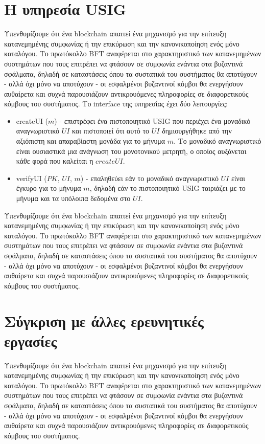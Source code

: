 \section{Η υπηρεσία USIG} \label{usigSection}
Υπενθυμίζουμε ότι ένα blockchain απαιτεί ένα μηχανισμό για την επίτευξη κατανεμημένης συμφωνίας ή την επικύρωση και την κανονικοποίηση ενός μόνο καταλόγου. Το πρωτόκολλο BFT αναφέρεται στο χαρακτηριστικό των κατανεμημένων συστημάτων που τους επιτρέπει να φτάσουν σε συμφωνία ενάντια στα βυζαντινά σφάλματα, δηλαδή σε καταστάσεις όπου τα συστατικά του συστήματος θα αποτύχουν - αλλά όχι μόνο να αποτύχουν - οι εσφαλμένοι βυζαντινοί κόμβοι θα ενεργήσουν αυθαίρετα και συχνά παρουσιάζουν αντικρουόμενες πληροφορίες σε διαφορετικούς κόμβους του συστήματος.
Το interface της υπηρεσίας έχει δύο λειτουργίες: 
\begin{itemize}
\item createUI ($m$) - επιστρέφει ένα πιστοποιητικό USIG που περιέχει ένα μοναδικό αναγνωριστικό $UI$ και πιστοποιεί ότι αυτό το $UI$ δημιουργήθηκε από την αξιόπιστη και απαραβίαστη μονάδα για το μήνυμα $m$. Το μοναδικό αναγνωριστικό είναι ουσιαστικά μια ανάγνωση του μονοτονικού μετρητή, ο οποίος αυξάνεται κάθε φορά που καλείται η $createUI$. 
\item verifyUI ($PK$, $UI$, $m$) - επαληθεύει εάν το μοναδικό αναγνωριστικό $UI$ είναι έγκυρο για το μήνυμα $m$, δηλαδή εάν το πιστοποιητικό USIG ταιριάζει με το μήνυμα και τα υπόλοιπα δεδομένα στο $UI$.
\end{itemize}

Υπενθυμίζουμε ότι ένα blockchain απαιτεί ένα μηχανισμό για την επίτευξη κατανεμημένης συμφωνίας ή την επικύρωση και την κανονικοποίηση ενός μόνο καταλόγου. Το πρωτόκολλο BFT αναφέρεται στο χαρακτηριστικό των κατανεμημένων συστημάτων που τους επιτρέπει να φτάσουν σε συμφωνία ενάντια στα βυζαντινά σφάλματα, δηλαδή σε καταστάσεις όπου τα συστατικά του συστήματος θα αποτύχουν - αλλά όχι μόνο να αποτύχουν - οι εσφαλμένοι βυζαντινοί κόμβοι θα ενεργήσουν αυθαίρετα και συχνά παρουσιάζουν αντικρουόμενες πληροφορίες σε διαφορετικούς κόμβους του συστήματος.

\section{Σύγκριση με άλλες ερευνητικές εργασίες}
Υπενθυμίζουμε ότι ένα blockchain απαιτεί ένα μηχανισμό για την επίτευξη κατανεμημένης συμφωνίας ή την επικύρωση και την κανονικοποίηση ενός μόνο καταλόγου. Το πρωτόκολλο BFT αναφέρεται στο χαρακτηριστικό των κατανεμημένων συστημάτων που τους επιτρέπει να φτάσουν σε συμφωνία ενάντια στα βυζαντινά σφάλματα, δηλαδή σε καταστάσεις όπου τα συστατικά του συστήματος θα αποτύχουν - αλλά όχι μόνο να αποτύχουν - οι εσφαλμένοι βυζαντινοί κόμβοι θα ενεργήσουν αυθαίρετα και συχνά παρουσιάζουν αντικρουόμενες πληροφορίες σε διαφορετικούς κόμβους του συστήματος.


